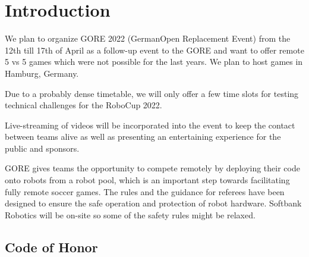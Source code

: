 \section{Introduction}

We plan to organize GORE 2022 (GermanOpen Replacement Event) from the 12th till 17th of April as a follow-up event to the GORE and want to offer remote 5 vs 5 games which were not possible for the last years. We plan to host games in Hamburg, Germany.

Due to a probably dense timetable, we will only offer a few time slots for testing technical challenges for the RoboCup 2022.

Live-streaming of videos will be incorporated into the event to keep the contact between teams alive as well as presenting an entertaining experience for the public and sponsors.

GORE gives teams the opportunity to compete remotely by deploying their code onto robots from a robot pool, which is an important step towards facilitating fully remote soccer games. The rules and the guidance for referees have been designed to ensure the safe operation and protection of robot hardware. Softbank Robotics will be on-site so some of the safety rules might be relaxed.

\subsection{Code of Honor}

